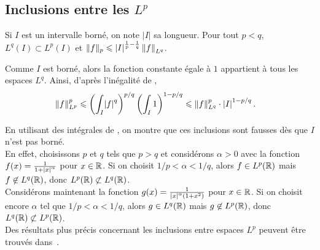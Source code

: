 \subsection{Inclusions entre les $L^p$}

\begin{theo}
Si $I$ est un intervalle borné, on note $|I|$ sa longueur. Pour tout $p < q$, $L^q(I) \subset L^p(I)$ et $\|f\|_p \leqslant \mathopen{}\left| I \right|^{\frac{1}{p} - \frac{1}{q}} \norm{f}_{L^q}$.
\end{theo}

\begin{demo}
Comme $I$ est borné, alors la fonction constante égale à $1$ appartient à tous les espaces $L^q$. Ainsi, d'après l'inégalité de ,
\begin{align*}
\norm{f}_{L^p}^p
&\leqslant \left(\int_I \mathopen{}\left| f \right|^q\right)^{p/q} \left(\int_I 1\right)^{1-p/q}
\leqslant \norm{f}_{L^q}^p \cdot \mathopen{}\left| I \right|^{1-p/q}.
\end{align*}
\end{demo}

\begin{remarque}
En utilisant des intégrales de , on montre que ces inclusions sont fausses dès que $I$ n'est pas borné. \\
En effet, choisissons $p$ et $q$ tels que $p > q$ et considérons $\alpha > 0$ avec la fonction $f(x) = \frac{1}{1+\mathopen{}\left| x \right|^\alpha}$ pour $x \in \mathbb{R}$. Si on choisit $1/p < \alpha < 1/q$, alors $f \in L^p(\mathbb{R})$ mais $f \not\in L^q(\mathbb{R})$, donc $L^p(\mathbb{R}) \not\subset L^q(\mathbb{R})$. \\
Considérons maintenant la fonction $g(x) = \frac{1}{\mathopen{}\left| x \right|^\alpha (1+x^2)}$ pour $x \in \mathbb{R}$. Si on choisit encore $\alpha$ tel que $1/p <  \alpha < 1/q$, alors $g \in L^q(\mathbb{R})$ mais $g \not\in L^p(\mathbb{R})$, donc $L^q(\mathbb{R}) \not\subset L^p(\mathbb{R})$.\\
Des résultats plus précis concernant les inclusions entre espaces $L^p$ peuvent être trouvés dans~\cite{rudin2009}.
\end{remarque}